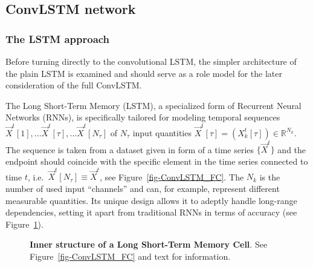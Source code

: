 \documentclass[
]{agujournal2019}
\begin{document}
\subsection{ConvLSTM network}\label{convlstm-network}

\subsubsection{The LSTM approach}\label{sec-LSTM}

Before turning directly to the convolutional LSTM, the simpler
architecture of the plain LSTM is examined and should serve as a role
model for the later consideration of the full ConvLSTM.

The Long Short-Term Memory (LSTM), a specialized form of Recurrent
Neural Networks (RNNs), is specifically tailored for modeling temporal
sequences
\(\vec{X}^t[1], \ldots \vec{X}^t[\tau],\ldots \vec{X}^t[N_\tau]\) of
\(N_\tau\) input quantities
\(\vec{X}^t[\tau] = (X^t_k[\tau]) \in \mathbb{R}^{N_k}\). The sequence
is taken from a dataset given in form of a time series \(\{\vec{X}^t\}\)
and the endpoint should coincide with the specific element in the time
series connected to time \(t\),
i.e.~\(\vec{X}^t[N_\tau] \equiv \vec{X}^t\), see
Figure~\ref{fig-ConvLSTM_FC}. The \(N_k\) is the number of used input
``channels'' and can, for example, represent different measurable
quantities. Its unique design allows it to adeptly handle long-range
dependencies, setting it apart from traditional RNNs in terms of
accuracy (see Figure~\ref{fig-lstm}).

\begin{figure}


\caption{\label{fig-lstm}\textbf{Inner structure of a Long Short-Term
Memory Cell}. See Figure~\ref{fig-ConvLSTM_FC} and text for
information.}

\end{figure}%
\end{document}

